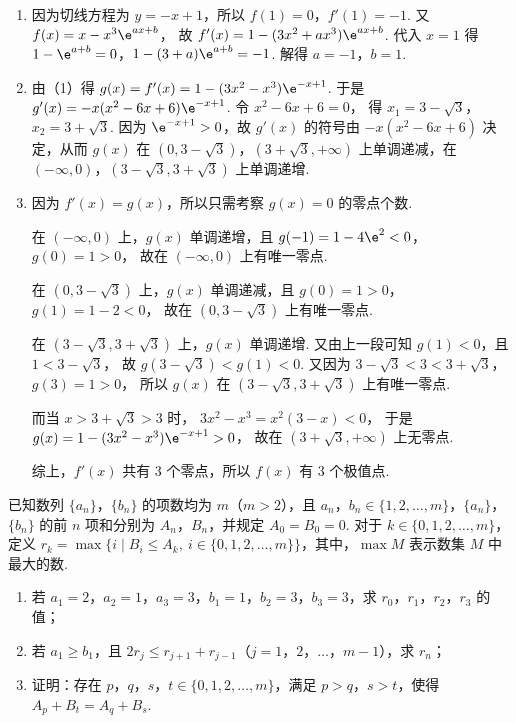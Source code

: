 \begin{solution}
\begin{enumerate}
\item 因为切线方程为 \(y=-x+1\)，所以
\(f(1)=0\)，\(f'(1)=-1\).
又
\(f(x)=x-x^3\e^{ax+b}\)，
故
\(f'(x)=1-(3x^2+ax^3)\e^{ax+b}\).
代入 \(x=1\) 得 \(1-\e^{a+b}=0\)，\(1-(3+a)\e^{a+b}=-1\).
解得
\(a=-1\)，\(b=1\).

\item 由（1）得
\(g(x)=f'(x)=1-(3x^2-x^3)\e^{-x+1}\).
于是
\(g'(x)=-x(x^2-6x+6)\e^{-x+1}\).
令
\(x^2-6x+6=0\)，
得
\(x_1=3-\sqrt{3}\)，\(x_2=3+\sqrt{3}\).
因为 \(\e^{-x+1}>0\)，故 \(g'(x)\) 的符号由 \(-x(x^2-6x+6)\) 决定，从而
\(g(x)\)
在
\((0,3-\sqrt{3})\)，\((3+\sqrt{3},+\infty)\)
上单调递减，在
\((-\infty,0)\)，\((3-\sqrt{3},3+\sqrt{3})\)
上单调递增.

\item 因为 \(f'(x)=g(x)\)，所以只需考察 \(g(x)=0\) 的零点个数.

在 \((-\infty,0)\) 上，\(g(x)\) 单调递增，且
\(g(-1)=1-4\e^2<0\)，\(g(0)=1>0\)，
故在 \((-\infty,0)\) 上有唯一零点.

在 \((0,3-\sqrt{3})\) 上，\(g(x)\) 单调递减，且
\(g(0)=1>0\)，\(g(1)=1-2<0\)，
故在 \((0,3-\sqrt{3})\) 上有唯一零点.

在 \((3-\sqrt{3},3+\sqrt{3})\) 上，\(g(x)\) 单调递增. 又由上一段可知 \(g(1)<0\)，且
\(1<3-\sqrt{3}\)，
故
\(g(3-\sqrt{3})<g(1)<0\).
又因为
\(3-\sqrt{3}<3<3+\sqrt{3}\)，\(g(3)=1>0\)，
所以 \(g(x)\) 在 \((3-\sqrt{3},3+\sqrt{3})\) 上有唯一零点.

而当 \(x>3+\sqrt{3}>3\) 时，
\(3x^2-x^3=x^2(3-x)<0\)，
于是
\(g(x)=1-(3x^2-x^3)\e^{-x+1}>0\)，
故在 \((3+\sqrt{3},+\infty)\) 上无零点.

综上，\(f'(x)\) 共有 3 个零点，所以 \(f(x)\) 有 3 个极值点.
\end{enumerate}
\end{solution}

\begin{problem}
已知数列 \(\{a_n\}\)，\(\{b_n\}\) 的项数均为 \(m\)（\(m>2\)），且 \(a_n\)，\(b_n\in\{1,2,\dots,m\}\)，\(\{a_n\}\)，\(\{b_n\}\) 的前 \(n\) 项和分别为 \(A_n\)，\(B_n\)，并规定 \(A_0=B_0=0\). 对于 \(k\in\{0,1,2,\dots,m\}\)，定义 \(r_k=\max \{ i\mid B_i\le A_k,\ i\in\{0,1,2,\dots,m\}\}\)，其中，\(\max M\) 表示数集 \(M\) 中最大的数.

\begin{enumerate}
\item 若 \(a_1=2\)，\(a_2=1\)，\(a_3=3\)，\(b_1=1\)，\(b_2=3\)，\(b_3=3\)，求 \(r_0\)，\(r_1\)，\(r_2\)，\(r_3\) 的值；
\item 若 \(a_1\ge b_1\)，且 \(2r_j\le r_{j+1}+r_{j-1}\)（\(j=1\)，\(2\)，\(\dots\)，\(m-1\)），求 \(r_n\)；
\item 证明：存在 \(p\)，\(q\)，\(s\)，\(t\in\{0,1,2,\dots,m\}\)，满足 \(p>q\)，\(s>t\)，使得 \(A_p+B_t=A_q+B_s\).
\end{enumerate}
\end{problem}

